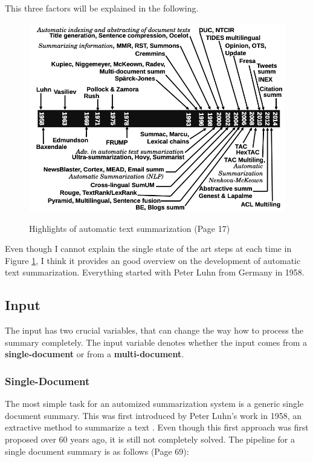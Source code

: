 This three factors will be explained in the following.

\begin{figure}
	\begin{center}
		\includegraphics[width=5.5in]{photos/history}\\
		\caption{Highlights of automatic text summarization \cite{juan} (Page 17)}\label{hist}
	\end{center}
\end{figure}

Even though I cannot explain the single state of the art steps at each time in Figure \ref{hist}, I think it provides an good overview on the development of automatic text summarization. Everything started with Peter Luhn from Germany in 1958.

\subsection{Input}\label{ss:input}

The input has two crucial variables, that can change the way how to process the summary completely. The input variable denotes whether the input comes from a \textbf{single-document} or from a \textbf{multi-document}. 

\subsubsection{Single-Document}\label{ss:sd}
The most simple task for an automized summarization system is a generic single document summary. This was first introduced by Peter Luhn's work in 1958, an extractive method to summarize a text \cite{textmining1958}.  Even though this first approach was first proposed over 60 years ago, it is still not completely solved. The pipeline for a single document summary is as follows \cite{juan} (Page 69):

